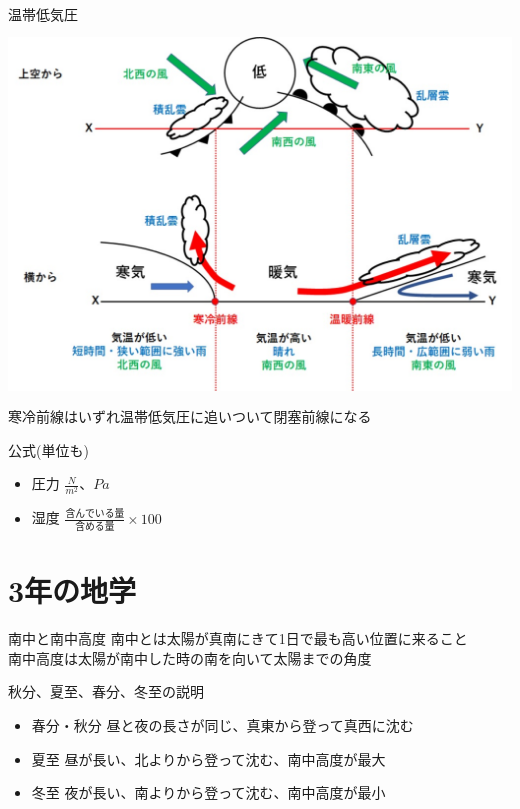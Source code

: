 \documentclass[10pt,dvipdfmx]{jsarticle}
\newcommand{\answer}[2]{{\color{orange}#2}}
\newcommand{\answer}[2]{\vspace{#1mm}}
\begin{document}
\begin{itembox}[l]{温帯低気圧}
	\answer{30}{
		\includegraphics[height=10cm]{science_figure/typhoo.pdf}\\
		寒冷前線はいずれ温帯低気圧に追いついて閉塞前線になる
	}
\end{itembox}

\begin{itembox}[l]{公式(単位も)}
	\begin{Large}
		\begin{itemize}
			\item 圧力 \answer{0}{$\frac{N}{m^2}、Pa$}
			\item 湿度 \answer{0}{$\frac{含んでいる量}{含める量}\times100$}
		\end{itemize}
	\end{Large}
\end{itembox}


\section{3年の地学}
\begin{itembox}[l]{南中と南中高度}
	\answer{10}{南中とは太陽が真南にきて1日で最も高い位置に来ること\\
		南中高度は太陽が南中した時の南を向いて太陽までの角度}
\end{itembox}

\begin{itembox}[l]{秋分、夏至、春分、冬至の説明}
	\answer{20}{
		\begin{itemize}
			\item 春分・秋分 昼と夜の長さが同じ、真東から登って真西に沈む
			\item 夏至 昼が長い、北よりから登って沈む、南中高度が最大
			\item 冬至 夜が長い、南よりから登って沈む、南中高度が最小
		\end{itemize}
	}
\end{itembox}
\end{document}
